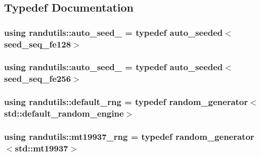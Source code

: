 \subsection{Typedef Documentation}
\subsubsection[{\texorpdfstring{auto\+\_\+seed\+\_\+128}{auto_seed_128}}]{\setlength{\rightskip}{0pt plus 5cm}using {\bf randutils\+::auto\+\_\+seed\+\_} = typedef {\bf auto\+\_\+seeded}$<${\bf seed\+\_\+seq\+\_\+fe128}$>$}\hypertarget{namespacerandutils_ac122072eca2bd6dc81a557e59147099c}{}\label{namespacerandutils_ac122072eca2bd6dc81a557e59147099c}
\subsubsection[{\texorpdfstring{auto\+\_\+seed\+\_\+256}{auto_seed_256}}]{\setlength{\rightskip}{0pt plus 5cm}using {\bf randutils\+::auto\+\_\+seed\+\_} = typedef {\bf auto\+\_\+seeded}$<${\bf seed\+\_\+seq\+\_\+fe256}$>$}\hypertarget{namespacerandutils_a96647abcb6ceb1ef0c3cf7c8875ae298}{}\label{namespacerandutils_a96647abcb6ceb1ef0c3cf7c8875ae298}
\subsubsection[{\texorpdfstring{default\+\_\+rng}{default_rng}}]{\setlength{\rightskip}{0pt plus 5cm}using {\bf randutils\+::default\+\_\+rng} = typedef {\bf random\+\_\+generator}$<$std\+::default\+\_\+random\+\_\+engine$>$}\hypertarget{namespacerandutils_a541e8d25081229bd349f2a5facb915a1}{}\label{namespacerandutils_a541e8d25081229bd349f2a5facb915a1}
\subsubsection[{\texorpdfstring{mt19937\+\_\+rng}{mt19937_rng}}]{\setlength{\rightskip}{0pt plus 5cm}using {\bf randutils\+::mt19937\+\_\+rng} = typedef {\bf random\+\_\+generator}$<$std\+::mt19937$>$}\hypertarget{namespacerandutils_a7ad409d0cae7ed019fd23cc64e3f764f}{}\label{namespacerandutils_a7ad409d0cae7ed019fd23cc64e3f764f}
